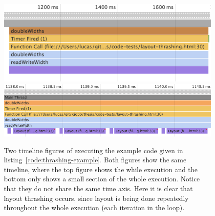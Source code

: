 \documentclass[a4paper,11pt]{kth-mag}
\begin{document}
        \pagebreak %
        \begin{figure}[h]
          \centering
          \includegraphics[scale=0.5]{images/layout-thrashing-example-1-big}
          \includegraphics[scale=0.5]{images/layout-thrashing-example-1}
          \caption{Two timeline figures of executing the example code given in listing~\ref{code:thrashing-example}. Both figures show the same timeline, where the top figure shows the while execution and the bottom only shows a small section of the whole execution. Notice that they do not share the same time axis. Here it is clear that layout thrashing occurs, since layout is being done repeatedly throughout the whole execution (each iteration in the loop).}
          \label{fig:layout-thrashing-example-1}
        \end{figure}
        
\end{document}

